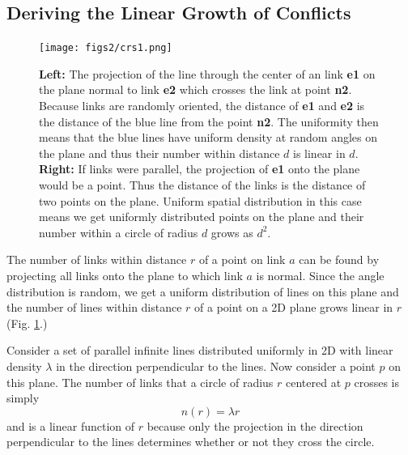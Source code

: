 \documentclass[endfloats,nofootinbib,preprint,floatfix,titlepage,superscriptaddress]{revtex4} %
\begin{document}
\subsection{Deriving the Linear Growth of Conflicts}

\begin{figure}
    \centering
    \texttt{[image: figs2/crs1.png]}
    \caption{\textbf{Left:} The projection of the line through the center of an link \textsf{\textbf{ e1}} on the plane normal to link \textsf{\textbf{ e2}} which crosses the link at point \textsf{\textbf{ n2}}. Because links are randomly oriented, the distance of \textsf{\textbf{ e1}} and \textsf{\textbf{ e2}} is the distance of the blue line from the point \textsf{\textbf{ n2}}. The uniformity then means that the blue lines have uniform density at random angles on the plane and thus their number within distance $d$ is linear in $d$. \textbf{Right:} If links were parallel, the projection of \textsf{\textbf{ e1}} onto the plane would be a point. Thus the distance of the links is the distance of two points on the plane. Uniform spatial distribution in this case means we get uniformly distributed points on the plane and their number within a circle of radius $d$ grows as $d^2$.}
    \label{fig:crs1}
\end{figure}

The number of links within distance $r$ of a point on link $a$  can be found by projecting all links onto the plane to which link $a$ is normal. 
Since the angle distribution is random, we get a uniform distribution of lines on this plane and the number of lines within distance $r$ of a point on a 2D plane grows linear in $r$ (Fig. \ref{fig:crs1}.)

Consider a set of parallel infinite lines distributed uniformly in 2D with linear density $\lambda$ in the direction perpendicular to the lines. Now consider a point $p$ on this plane. The number of links that a circle of radius $r$ centered at $p$ crosses is simply
\[n(r) = \lambda r \] 
and is a linear function of $r$ because only the projection in the direction perpendicular to the lines determines whether or not they cross the circle. 
\end{document}
